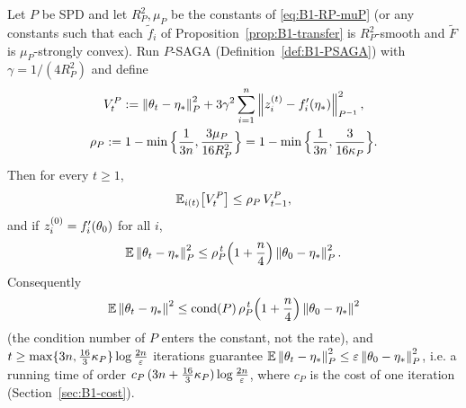 \begin{corollary}\label{cor:B1-rate}
Let $P$ be SPD and let $R_P^2,\mu_P$ be the constants of \eqref{eq:B1-RP-muP} (or any constants such that
each $\tilde f_i$ of Proposition~\ref{prop:B1-transfer} is $R_P^2$-smooth and $\tilde F$ is $\mu_P$-strongly
convex). Run $P$-SAGA (Definition~\ref{def:B1-PSAGA}) with $\gamma=1/(4R_P^2)$ and define
\begin{gather}
V_t^P:=\left\|\theta_t-\eta_\ast\right\|_P^2+3\gamma^2\sum_{i=1}^n\left\|z_i^{(t)}-f'_i(\eta_\ast)\right\|_{P^{-1}}^2,\nonumber\\
\rho_P:=1-\min\Big\{\frac1{3n},\frac{3\mu_P}{16R_P^2}\Big\}=1-\min\Big\{\frac1{3n},\frac{3}{16\kappa_P}\Big\}.\label{eq:B1-VP}
\end{gather}
Then for every $t\ge1$,
\begin{equation}\label{eq:B1-onestep}
\mathbb{E}_{i(t)}\big[V_t^P\big]\le\rho_P\,V_{t-1}^P ,
\end{equation}
and if $z_i^{(0)}=f'_i(\theta_0)$ for all $i$,
\begin{equation}\label{eq:B1-rate}
\mathbb{E}\left\|\theta_t-\eta_\ast\right\|_P^2\le\rho_P^{\,t}\Big(1+\frac n4\Big)\left\|\theta_0-\eta_\ast\right\|_P^2 .
\end{equation}
Consequently
\[
\mathbb{E}\left\|\theta_t-\eta_\ast\right\|^2\le\operatorname{cond}(P)\,\rho_P^{\,t}\Big(1+\frac n4\Big)\left\|\theta_0-\eta_\ast\right\|^2
\]
(the condition number of $P$ enters the constant, not the rate), and
$t\ge\max\{3n,\frac{16}{3}\kappa_P\}\log\frac{2n}{\varepsilon}$ iterations guarantee
$\mathbb{E}\left\|\theta_t-\eta_\ast\right\|_P^2\le\varepsilon\left\|\theta_0-\eta_\ast\right\|_P^2$, i.e. a running time of order
$c_P\,(3n+\frac{16}{3}\kappa_P)\log\frac{2n}{\varepsilon}$, where $c_P$ is the cost of one iteration
(Section~\ref{sec:B1-cost}).
\end{corollary}

